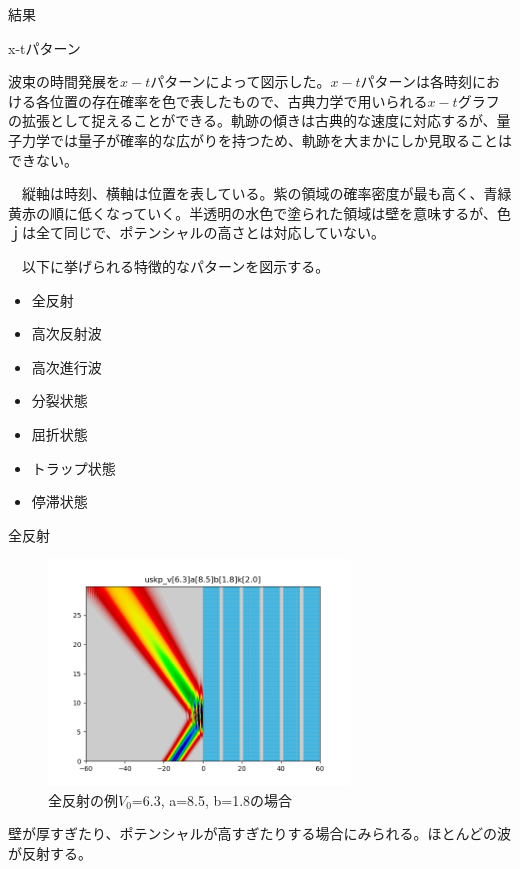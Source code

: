 \documentclass[a4paper, lualatex]{bxjsarticle}
\begin{document}
\begin{section}{結果}
    \begin{subsection}{x-tパターン}
        \par 波束の時間発展を$x-t$パターンによって図示した。$x-t$パターンは各時刻における各位置の存在確率を色で表したもので、古典力学で用いられる$x-t$グラフの拡張として捉えることができる。軌跡の傾きは古典的な速度に対応するが、量子力学では量子が確率的な広がりを持つため、軌跡を大まかにしか見取ることはできない。
        \par　縦軸は時刻、横軸は位置を表している。紫の領域の確率密度が最も高く、青緑黄赤の順に低くなっていく。半透明の水色で塗られた領域は壁を意味するが、色ｊは全て同じで、ポテンシャルの高さとは対応していない。
        \par　以下に挙げられる特徴的なパターンを図示する。
        \begin{itemize}
            \item 全反射
            \item 高次反射波
            \item 高次進行波
            \item 分裂状態
            \item 屈折状態
            \item トラップ状態
            \item 停滞状態
        \end{itemize}
    \end{subsection}
    \begin{subsection}{全反射}
        \begin{figure}[h]
            \centering
            \includegraphics[width=8cm]{zenhansha.png}
            \caption{全反射の例$V_0$=6.3, a=8.5, b=1.8の場合}
        \end{figure}
    \par 壁が厚すぎたり、ポテンシャルが高すぎたりする場合にみられる。ほとんどの波が反射する。
    \end{subsection}

\end{section}
\end{document}
